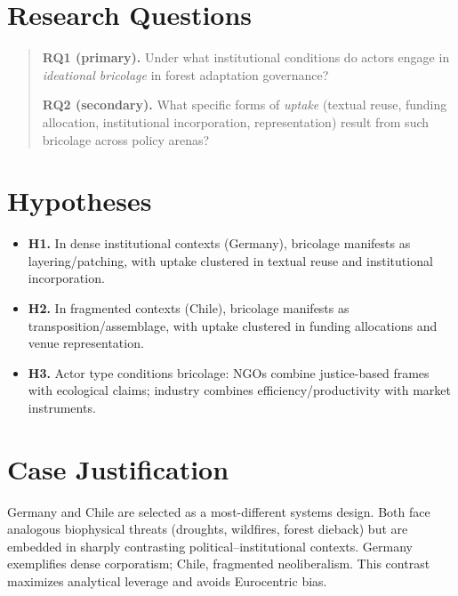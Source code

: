 \section*{Research Questions}
\begin{quote}
\textbf{RQ1 (primary).} Under what institutional conditions do actors engage in 
\emph{ideational bricolage} in forest adaptation governance?  

\textbf{RQ2 (secondary).} What specific forms of \emph{uptake} (textual reuse, funding allocation, 
institutional incorporation, representation) result from such bricolage across policy arenas?  
\end{quote}

\section*{Hypotheses}
\begin{itemize}
  \item \textbf{H1.} In dense institutional contexts (Germany), bricolage manifests as layering/patching, 
  with uptake clustered in textual reuse and institutional incorporation.  
  \item \textbf{H2.} In fragmented contexts (Chile), bricolage manifests as transposition/assemblage, 
  with uptake clustered in funding allocations and venue representation.  
  \item \textbf{H3.} Actor type conditions bricolage: NGOs combine justice-based frames with ecological claims; 
  industry combines efficiency/productivity with market instruments.  
\end{itemize}

\section*{Case Justification}
Germany and Chile are selected as a most-different systems design. Both face analogous biophysical threats 
(droughts, wildfires, forest dieback) but are embedded in sharply contrasting political–institutional contexts. 
Germany exemplifies dense corporatism; Chile, fragmented neoliberalism. This contrast maximizes analytical leverage 
and avoids Eurocentric bias.